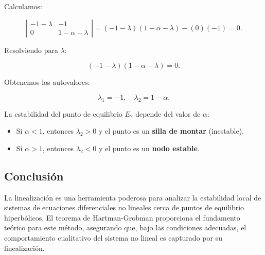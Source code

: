 Calculamos:

\begin{equation}
    \left| \begin{array}{cc}
        -1 - \lambda & -1 \\
        0 & 1 - \alpha - \lambda
    \end{array} \right| = (-1 - \lambda)(1 - \alpha - \lambda) - (0)(-1) = 0.
\end{equation}

Resolviendo para $\lambda$:

\begin{equation}
    (-1 - \lambda)(1 - \alpha - \lambda) = 0.
\end{equation}

Obtenemos los autovalores:

\begin{equation}
    \lambda_1 = -1, \quad \lambda_2 = 1 - \alpha.
\end{equation}

La estabilidad del punto de equilibrio $E_2$ depende del valor de $\alpha$:

\begin{itemize}
    \item Si $\alpha < 1$, entonces $\lambda_2 > 0$ y el punto es un \textbf{silla de montar} (inestable).
    \item Si $\alpha > 1$, entonces $\lambda_2 < 0$ y el punto es un \textbf{nodo estable}.
\end{itemize}

\subsection{Conclusión}

La linealización es una herramienta poderosa para analizar la estabilidad local de sistemas de ecuaciones diferenciales no lineales cerca de puntos de equilibrio hiperbólicos. El teorema de Hartman-Grobman proporciona el fundamento teórico para este método, asegurando que, bajo las condiciones adecuadas, el comportamiento cualitativo del sistema no lineal es capturado por su linealización.
